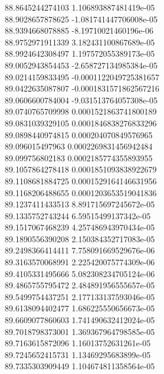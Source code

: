 {88.8645244274103 1.106893887481419e-05 \\
88.9028657878625 -1.081741447706008e-05 \\
88.9394668078885 -8.19710021460196e-06 \\
88.9752971911339 3.182431100867689e-05 \\
88.9924642308497 1.197572055389173e-05 \\
89.0052943854453 -2.658727134985384e-05 \\
89.0214159833495 -0.0001122049725381657 \\
89.0422635087807 -0.0001831571862567216 \\
89.0606600784004 -9.031513764057308e-05 \\
89.0740765709998 0.0001521863741800189 \\
89.0831039329105 0.0001846838276833296 \\
89.0898440974815 0.000204070849576965 \\
89.096015497963 0.0002269831456942484 \\
89.099756802183 0.0002185774355893955 \\
89.1057864278418 0.0001851093838922679 \\
89.1108681884725 0.0001529164146631956 \\
89.1168206488655 0.0001203653519041836 \\
89.1237411433513 8.891715697245672e-05 \\
89.1335752743244 6.59515499137342e-05 \\
89.1517067468239 4.257486943970434e-05 \\
89.1890556390208 2.150384352717083e-05 \\
89.2498366414411 7.758091669529676e-06 \\
89.3163570068991 2.225420075774309e-06 \\
89.4105331495666 5.082308234705124e-06 \\
89.4865755795472 2.484891956555657e-05 \\
89.5499754437251 2.177133137593046e-05 \\
89.6138094402477 1.686225550656673e-05 \\
89.6609077860603 1.741490632412024e-05 \\
89.7018798373001 1.369367964798585e-05 \\
89.7163615872096 1.16013752631261e-05 \\
89.7245652415731 1.13469295683899e-05 \\
89.7335303909449 1.104674811358564e-05 \\
}
